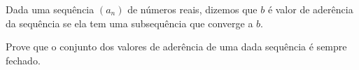 Dada uma sequência $(a_n)$ de números reais, dizemos que $b$ é valor de aderência da sequência se ela tem uma subsequência que converge a $b$.

Prove que o conjunto dos valores de aderência de uma dada sequência é sempre fechado.
